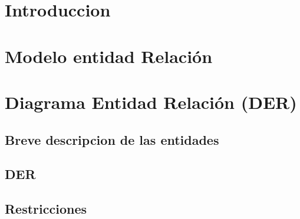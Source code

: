 \documentclass[10pt, a4paper]{article}
\author{Base de Datos, DC, UBA.}
\date{}
\title{}
\begin{document}
\thispagestyle{empty}
\titulo{}
\maketitle

\tableofcontents

\NoCaptionOfAlgo
\DontPrintSemicolon
\SetAlFnt{\ttfamily}

\newpage

\section{Introduccion}

	
 
\section{Modelo entidad Relaci\'on}

	

\newpage

\section{Diagrama Entidad Relaci\'on (DER)}

	\subsection{Breve descripcion de las entidades}

		

	\newpage
	\subsection{DER}

		

	\newpage
	
	\subsection{Restricciones}
	
		

\newpage
\end{document}
